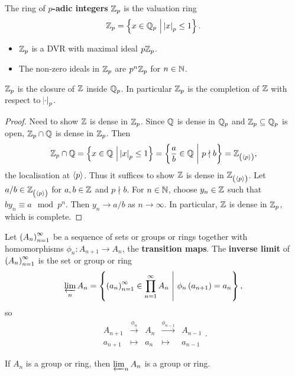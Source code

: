 \begin{definition}
The ring of \textbf{$ p $-adic integers} $ \mathbb{Z}_p $ is the valuation ring
$$ \ZZ_p = \cbr{x \in \QQ_p \st \abs{x}_p \le 1}. $$
\end{definition}

\begin{fact*}
\hfill
\begin{itemize}
\item $ \mathbb{Z}_p $ is a DVR with maximal ideal $ p\mathbb{Z}_p $.
\item The non-zero ideals in $ \mathbb{Z}_p $ are $ p^n\mathbb{Z}_p $ for $ n \in \mathbb{N} $.
\end{itemize}
\end{fact*}

\begin{proposition}
$ \mathbb{Z}_p $ is the closure of $ \mathbb{Z} $ inside $ \mathbb{Q}_p $. In particular $ \mathbb{Z}_p $ is the completion of $ \mathbb{Z} $ with respect to $ \abs{\cdot}_p $.
\end{proposition}

\begin{proof}
Need to show $ \mathbb{Z} $ is dense in $ \mathbb{Z}_p $. Since $ \mathbb{Q} $ is dense in $ \mathbb{Q}_p $ and $ \mathbb{Z}_p \subseteq \mathbb{Q}_p $ is open, $ \mathbb{Z}_p \cap \mathbb{Q} $ is dense in $ \mathbb{Z}_p $. Then
$$ \ZZ_p \cap \QQ = \cbr{x \in \QQ \st \abs{x}_p \le 1} = \cbr{\dfrac{a}{b} \in \QQ \st p \nmid b} = \ZZ_{\br{\abr{p}}}, $$
the localisation at $ \left\langle p \right\rangle $. Thus it suffices to show $ \mathbb{Z} $ is dense in $ \ZZ_{\br{\abr{p}}} $. Let $ a / b \in \ZZ_{\br{\abr{p}}} $ for $ a, b \in \mathbb{Z} $ and $ p \nmid b $. For $ n \in \mathbb{N} $, choose $ y_n \in \mathbb{Z} $ such that $ by_n \equiv a \mod p^n $. Then $ y_n \to a / b $ as $ n \to \infty $. In particular, $ \mathbb{Z} $ is dense in $ \mathbb{Z}_p $, which is complete.
\end{proof}

Let $ \br{A_n}_{n = 1}^\infty $ be a sequence of sets or groups or rings together with homomorphisms $ \phi_n : A_{n + 1} \to A_n $, the \textbf{transition maps}. The \textbf{inverse limit} of $ \br{A_n}_{n = 1}^\infty $ is the set or group or ring
$$ \varprojlim_n A_n = \cbr{\br{a_n}_{n = 1}^\infty \in \prod_{n = 1}^\infty A_n \st \phi_n\br{a_{n + 1}} = a_n}, $$
so
$$
\begin{array}{ccccc}
A_{n + 1} & \xrightarrow{\phi_n} & A_n & \xrightarrow{\phi_{n - 1}} & A_{n - 1} \\
a_{n + 1} & \longmapsto & a_n & \longmapsto & a_{n - 1}
\end{array}.
$$

\begin{fact*}
If $ A_n $ is a group or ring, then $ \varprojlim_n A_n $ is a group or ring.
\end{fact*}

